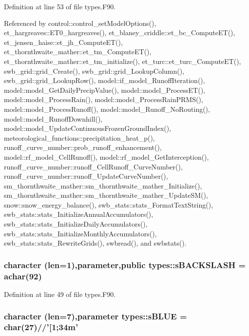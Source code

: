 Definition at line 53 of file types.F90.



Referenced by control::control\_\-setModelOptions(), et\_\-hargreaves::ET0\_\-hargreaves(), et\_\-blaney\_\-criddle::et\_\-bc\_\-ComputeET(), et\_\-jensen\_\-haise::et\_\-jh\_\-ComputeET(), et\_\-thornthwaite\_\-mather::et\_\-tm\_\-ComputeET(), et\_\-thornthwaite\_\-mather::et\_\-tm\_\-initialize(), et\_\-turc::et\_\-turc\_\-ComputeET(), swb\_\-grid::grid\_\-Create(), swb\_\-grid::grid\_\-LookupColumn(), swb\_\-grid::grid\_\-LookupRow(), model::if\_\-model\_\-RunoffIteration(), model::model\_\-GetDailyPrecipValue(), model::model\_\-ProcessET(), model::model\_\-ProcessRain(), model::model\_\-ProcessRainPRMS(), model::model\_\-ProcessRunoff(), model::model\_\-Runoff\_\-NoRouting(), model::model\_\-RunoffDownhill(), model::model\_\-UpdateContinuousFrozenGroundIndex(), meteorological\_\-functions::precipitation\_\-heat\_\-p(), runoff\_\-curve\_\-number::prob\_\-runoff\_\-enhancement(), model::rf\_\-model\_\-CellRunoff(), model::rf\_\-model\_\-GetInterception(), runoff\_\-curve\_\-number::runoff\_\-CellRunoff\_\-CurveNumber(), runoff\_\-curve\_\-number::runoff\_\-UpdateCurveNumber(), sm\_\-thornthwaite\_\-mather::sm\_\-thornthwaite\_\-mather\_\-Initialize(), sm\_\-thornthwaite\_\-mather::sm\_\-thornthwaite\_\-mather\_\-UpdateSM(), snow::snow\_\-energy\_\-balance(), swb\_\-stats::stats\_\-FormatTextString(), swb\_\-stats::stats\_\-InitializeAnnualAccumulators(), swb\_\-stats::stats\_\-InitializeDailyAccumulators(), swb\_\-stats::stats\_\-InitializeMonthlyAccumulators(), swb\_\-stats::stats\_\-RewriteGrids(), swbread(), and swbstats().

\hypertarget{namespacetypes_a7ac07dde59c21f645da2f523cc34afe1}{
\subsubsection[{sBACKSLASH}]{\setlength{\rightskip}{0pt plus 5cm}character (len=1),parameter,public {\bf types::sBACKSLASH} = achar(92)}}
\label{namespacetypes_a7ac07dde59c21f645da2f523cc34afe1}


Definition at line 49 of file types.F90.

\hypertarget{namespacetypes_a4bb1513c56bea1b41dd352849448a56c}{
\subsubsection[{sBLUE}]{\setlength{\rightskip}{0pt plus 5cm}character (len=7),parameter {\bf types::sBLUE} = char(27)//'\mbox{[}1;34m'}}
\label{namespacetypes_a4bb1513c56bea1b41dd352849448a56c}


